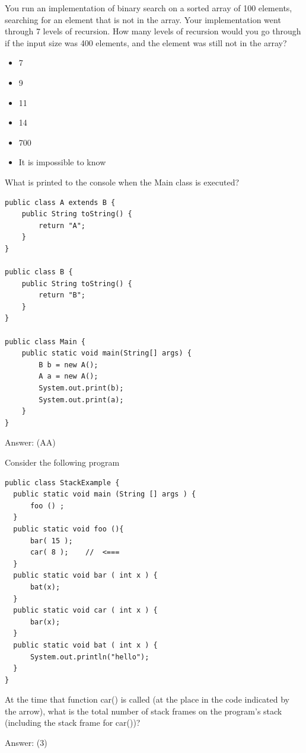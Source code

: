 \begin{question}
You run an implementation of binary search on a sorted array of 100 elements, searching for an element that is not in the array. Your implementation went through 7 levels of recursion.
How many levels of recursion would you go through if the input size was 400 elements, and the element was still not in the array?
\begin{itemize}[leftmargin=2em,itemsep=1pt,topsep=2pt]
\item[\cb{0}] 7
\item[\cb{1}] 9
\item[\cb{0}] 11
\item[\cb{0}] 14
\item[\cb{0}] 700
\item[\cb{0}] It is impossible to know
\end{itemize}
\end{question}

\begin{question}
What is printed to the console when the Main class is executed?

\begin{lstlisting}
public class A extends B {
    public String toString() {
        return "A";
    }
}

public class B {
    public String toString() {
        return "B";
    }
}

public class Main {
    public static void main(String[] args) {
        B b = new A();
        A a = new A();
        System.out.print(b);
        System.out.print(a);
    }
}
\end{lstlisting}

Answer: \underline{\hspace{1in}} \ifanswers (AA)\fi
\end{question}

\begin{question}
Consider the following program

\begin{lstlisting}
public class StackExample {
  public static void main (String [] args ) {
      foo () ;
  }
  public static void foo (){
      bar( 15 );
      car( 8 );    //  <===
  }
  public static void bar ( int x ) {
      bat(x);
  }
  public static void car ( int x ) {
      bar(x);
  }
  public static void bat ( int x ) {
      System.out.println("hello");
  }
}
\end{lstlisting}

At the time that function car() is called (at the place in the code indicated by the arrow), what is the total number of stack frames on the program's stack (including the stack frame for car())?

Answer: \underline{\hspace{1in}} \ifanswers (3)\fi
\end{question}

